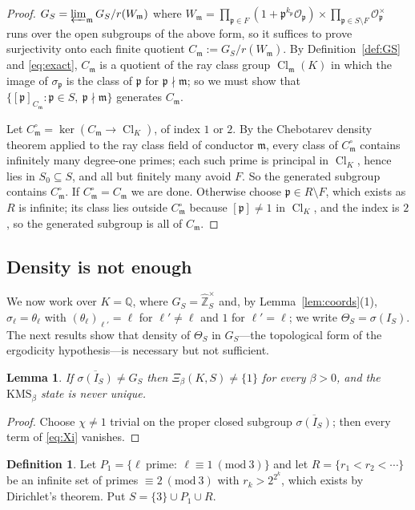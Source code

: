 \documentclass[11pt]{amsart}
\numberwithin{equation}{section}
\newtheorem{lemma}[theorem]{Lemma}
\theoremstyle{definition}
\newtheorem{definition}[theorem]{Definition}
\theoremstyle{remark}
\newcommand{\Z}{\mathbb{Z}}
\newcommand{\Q}{\mathbb{Q}}
\newcommand{\hZ}{\widehat{\Z}}
\newcommand{\Cl}{\operatorname{Cl}}
\newcommand{\cO}{\mathcal{O}}
\newcommand{\pp}{\mathfrak{p}}
\newcommand{\mm}{\mathfrak{m}}
\begin{document}
\begin{proof}
$G_S=\varprojlim_\mm G_S/r(W_\mm)$ where
$W_\mm=\prod_{\pp\in F}(1+\pp^{k_\pp}\cO_\pp)\times\prod_{\pp\in S\setminus F}\cO_\pp^\times$
runs over the open subgroups of the above form, so it suffices to prove
surjectivity onto each finite quotient $C_\mm:=G_S/r(W_\mm)$. By
Definition~\ref{def:GS} and \eqref{eq:exact}, $C_\mm$ is a quotient of the ray
class group $\Cl_\mm(K)$ in which the image of $\sigma_\pp$ is the class of
$\pp$ for $\pp\nmid\mm$; so we must show that
$\{[\pp]_{C_\mm}:\pp\in S,\ \pp\nmid\mm\}$ generates $C_\mm$.

Let $C^\circ_\mm=\ker(C_\mm\to\Cl_K)$, of index $1$ or $2$. By the Chebotarev
density theorem applied to the ray class field of conductor $\mm$, every class
of $C^\circ_\mm$ contains infinitely many degree-one primes; each such prime is
principal in $\Cl_K$, hence lies in $S_0\subseteq S$, and all but finitely many
avoid $F$. So the generated subgroup contains $C^\circ_\mm$. If
$C^\circ_\mm=C_\mm$ we are done. Otherwise choose $\pp\in R\setminus F$, which
exists as $R$ is infinite; its class lies outside $C^\circ_\mm$ because
$[\pp]\neq1$ in $\Cl_K$, and the index is $2$, so the generated subgroup is all
of $C_\mm$.
\end{proof}

\subsection{Density is not enough}\label{sec:density}

We now work over $K=\Q$, where $G_S=\hZ_S^\times$ and, by Lemma~\ref{lem:coords}(1),
$\sigma_\ell=\theta_\ell$ with $(\theta_\ell)_{\ell'}=\ell$ for
$\ell'\neq\ell$ and $1$ for $\ell'=\ell$; we write $\Theta_S=\sigma(I_S)$. The
next results show that density of $\Theta_S$ in $G_S$---the topological form of
the ergodicity hypothesis---is necessary but not sufficient.

\begin{lemma}\label{lem:densenec}
If $\overline{\sigma(I_S)}\neq G_S$ then $\Xi_\beta(K,S)\neq\{1\}$ for every
$\beta>0$, and the $\mathrm{KMS}_\beta$ state is never unique.
\end{lemma}

\begin{proof}
Choose $\chi\neq1$ trivial on the proper closed subgroup
$\overline{\sigma(I_S)}$; then every term of \eqref{eq:Xi} vanishes.
\end{proof}

\begin{definition}\label{def:S3}
Let $P_1=\{\ell\ \text{prime}:\ \ell\equiv1\ (\mathrm{mod}\ 3)\}$ and let
$R=\{r_1<r_2<\cdots\}$ be an infinite set of primes $\equiv2\ (\mathrm{mod}\ 3)$
with $r_k>2^{2^k}$, which exists by Dirichlet's theorem. Put
$S=\{3\}\cup P_1\cup R$.
\end{definition}
\end{document}
